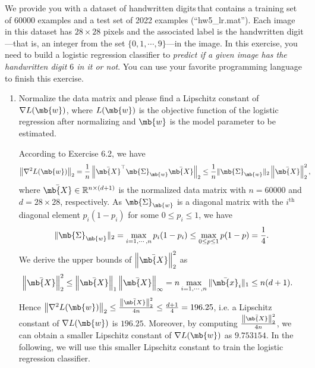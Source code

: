 \begin{exercise}

    We provide you with a dataset of handwritten digits\footnotemark\,that contains a training set of 60000 examples and a test set of 2022 examples (``hw5\_lr.mat''). Each image in this dataset  has $28\times28$ pixels and the associated label is the handwritten digit---that is, an integer from the set $\{0,1,\cdots,9\}$---in the image. In this exercise, you need to build a logistic regression classifier to \textit{predict if a given image has the handwritten digit $6$ in it or not}. You can use your favorite programming language to finish this exercise.
    \begin{enumerate}
        \item Normalize the data matrix and please find a Lipschitz constant of $\nabla L(\mb{w})$, where $L(\mb{w})$ is the objective function of the logistic regression after normalizing and  $\mb{w}$ is the model parameter to be estimated.

            \begin{solution}
                According to Exercise 6.2, we have
                \begin{align*}
                    \left\|\nabla^2 L(\mb{w})\right\|_2 & = \frac{1}{n}\left\|\bar{\mb{X}}^\top \mb{\Sigma}_\mb{w} \bar{\mb{X}}\right\|_2 \le \frac{1}{n} \|\mb{\Sigma}_\mb{w}\|_2 \left\|\bar{\mb{X}}\right\|^2_2,
                \end{align*}
                where $\bar{\mb{X}} \in \mathbb{R}^{n\times (d+1)}$ is the normalized data matrix with $n=60000$ and $d=28\times 28$, respectively. As $\mb{\Sigma}_\mb{w}$ is a diagonal matrix with the $i^\text{th}$ diagonal element $p_i(1-p_i)$ for some $0\le p_i\le 1$, we have
                \begin{align*}
                    \|\mb{\Sigma}_\mb{w}\|_2 = \max_{i=1,\cdots,n} p_i (1-p_i) \le \max_{0\le p\le 1} p(1-p) = \frac{1}{4}.
                \end{align*}
                We derive the upper bounds of $\left\|\bar{\mb{X}}\right\|^2_2$ as
                \begin{align*}
                    \left\|\bar{\mb{X}}\right\|^2_2 & \le \left\|\bar{\mb{X}}\right\|_1 \left\|\bar{\mb{X}}\right\|_\infty = n \max_{i=1,\cdots,n} \| \bar{\mb{x}}_i\|_1 \le n (d+1).
                \end{align*}
                Hence $\left\|\nabla^2 L(\mb{w})\right\|_2 \le \frac{\left\|\bar{\mb{X}}\right\|^2_2}{4n} \le \frac{d+1}{4} = 196.25$, i.e. a Lipschitz constant of $\nabla L(\mb{w})$ is $196.25$.
                Moreover, by computing $\frac{\left\|\bar{\mb{X}}\right\|^2_2}{4n}$, we can obtain a smaller Lipschitz constant of $\nabla L(\mb{w})$ as $9.753154$. In the following, we will use this smaller Lipschitz constant to train the logistic regression classifier.
                \qedhere
            \end{solution}


\end{enumerate}
\end{exercise}
